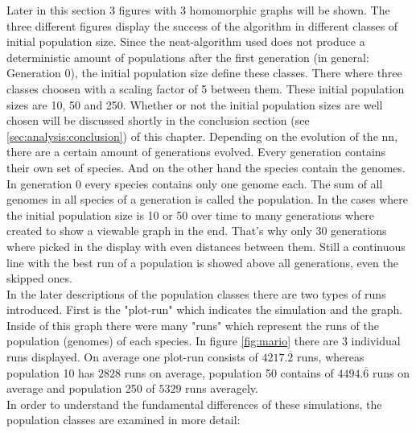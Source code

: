 		Later in this section 3 figures with 3 homomorphic graphs will be shown. The three different figures display the success of the algorithm in different classes of initial population size. Since the \gls{neat}-algorithm used does not produce a deterministic amount of populations after the first generation (in general: Generation 0), the initial population size define these classes. There where three classes choosen with a scaling factor of 5 between them. These initial population sizes are 10, 50 and 250. Whether or not the initial population sizes are well chosen will be discussed shortly in the conclusion section (see \ref{sec:analysis:conclusion}) of this chapter. Depending on the evolution of the \gls{nn}, there are a certain amount of generations evolved. Every generation contains their own set of species. And on the other hand the species contain the genomes. In generation 0 every species contains only one genome each. The sum of all genomes in all species of a generation is called the population. In the cases where the initial population size is 10 or 50 over time to many generations where created to show a viewable graph in the end. That's why only 30 generations where picked in the display with even distances between them. Still a continuous line with the best run of a population is showed above all generations, even the skipped ones. \\
		In the later descriptions of the population classes there are two types of runs introduced. First is the "plot-run" which indicates the simulation and the graph. Inside of this graph there were many "runs" which represent the runs of the population (genomes) of each species. In figure \ref{fig:mario} there are 3 individual runs displayed. On average one plot-run consists of $4217.\overline{2}$ runs, whereas population 10 has $2828$ runs on average, population 50 contains of $4494.\overline{6}$ runs on average and population 250 of $5329$ runs averagely.\\
		In order to understand the fundamental differences of these simulations, the population classes are examined in more detail: 
